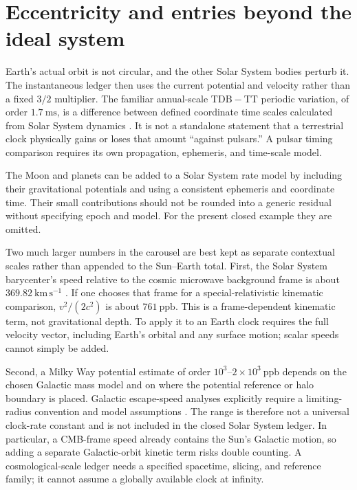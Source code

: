 \documentclass[12pt]{article}
\begin{document}
\section{Eccentricity and entries beyond the ideal system}

Earth's actual orbit is not circular, and the other Solar System bodies perturb it. The instantaneous ledger then uses the current potential and velocity rather than a fixed $3/2$ multiplier. The familiar annual-scale $\mathrm{TDB}-\mathrm{TT}$ periodic variation, of order $1.7\ \mathrm{ms}$, is a difference between defined coordinate time scales calculated from Solar System dynamics \cite{IERS2010,Fairhead1990}. It is not a standalone statement that a terrestrial clock physically gains or loses that amount ``against pulsars.'' A pulsar timing comparison requires its own propagation, ephemeris, and time-scale model.

The Moon and planets can be added to a Solar System rate model by including their gravitational potentials and using a consistent ephemeris and coordinate time. Their small contributions should not be rounded into a generic residual without specifying epoch and model. For the present closed example they are omitted.

Two much larger numbers in the carousel are best kept as separate contextual scales rather than appended to the Sun--Earth total. First, the Solar System barycenter's speed relative to the cosmic microwave background frame is about $369.82\ \mathrm{km\,s^{-1}}$ \cite{Planck2020}. If one chooses that frame for a special-relativistic kinematic comparison, $v^2/(2c^2)$ is about $761\ \mathrm{ppb}$. This is a frame-dependent kinematic term, not gravitational depth. To apply it to an Earth clock requires the full velocity vector, including Earth's orbital and any surface motion; scalar speeds cannot simply be added.

Second, a Milky Way potential estimate of order $10^3$--$2\times10^3\ \mathrm{ppb}$ depends on the chosen Galactic mass model and on where the potential reference or halo boundary is placed. Galactic escape-speed analyses explicitly require a limiting-radius convention and model assumptions \cite{Deason2019}. The range is therefore not a universal clock-rate constant and is not included in the closed Solar System ledger. In particular, a CMB-frame speed already contains the Sun's Galactic motion, so adding a separate Galactic-orbit kinetic term risks double counting. A cosmological-scale ledger needs a specified spacetime, slicing, and reference family; it cannot assume a globally available clock at infinity.
\end{document}
